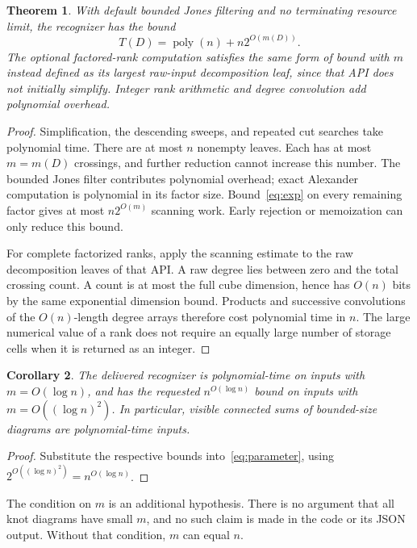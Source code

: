 \documentclass[11pt]{article}
\newtheorem{theorem}{Theorem}[section]
\newtheorem{corollary}[theorem]{Corollary}
\theoremstyle{definition}\newtheorem{definition}[theorem]{Definition}
\theoremstyle{remark}\newtheorem{remark}[theorem]{Remark}
\newcommand{\poly}{\operatorname{poly}}
\begin{document}
\begin{theorem}\label{thm:parameter}
With default bounded Jones filtering and no terminating resource limit, the
recognizer has the bound
\begin{equation}\label{eq:parameter}
 T(D)=\poly(n)+n2^{O(m(D))}.
\end{equation}
The optional factored-rank computation satisfies the same form of bound with
$m$ instead defined as its largest \emph{raw-input} decomposition leaf, since
that API does not initially simplify. Integer rank arithmetic and degree
convolution add polynomial overhead.
\end{theorem}
\begin{proof}
Simplification, the descending sweeps, and repeated cut searches take
polynomial time. There are at most $n$ nonempty leaves. Each has at most
$m=m(D)$ crossings, and further reduction cannot increase this number.
The bounded Jones filter contributes polynomial overhead; exact Alexander
computation is polynomial in its factor size. Bound~\eqref{eq:exp} on every
remaining factor gives at most $n2^{O(m)}$ scanning work. Early rejection or
memoization can only reduce this bound.

For complete factorized ranks, apply the scanning estimate to the raw
decomposition leaves of that API. A raw degree lies between zero and the total
crossing count. A count is at most the full cube dimension, hence has $O(n)$
bits by the same exponential dimension bound. Products and successive
convolutions of the $O(n)$-length degree arrays therefore cost polynomial
time in $n$. The large numerical value of a rank does not require an equally
large number of storage cells when it is returned as an integer.
\end{proof}

\begin{corollary}\label{cor:qp}
The delivered recognizer is polynomial-time on inputs with $m=O(\log n)$,
and has the requested $n^{O(\log n)}$ bound on inputs with
$m=O((\log n)^2)$. In particular, visible connected sums of bounded-size
diagrams are polynomial-time inputs.
\end{corollary}
\begin{proof}
Substitute the respective bounds into~\eqref{eq:parameter}, using
$2^{O((\log n)^2)}=n^{O(\log n)}$.
\end{proof}

The condition on $m$ is an additional hypothesis. There is no argument that
all knot diagrams have small $m$, and no such claim is made in the code or
its JSON output. Without that condition, $m$ can equal $n$.
\end{document}
